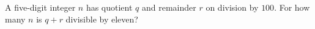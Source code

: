 A five-digit integer $n$ has quotient $q$ and remainder $r$ on division by $100$. For how many $n$ is $q+r$ divisible by eleven?

